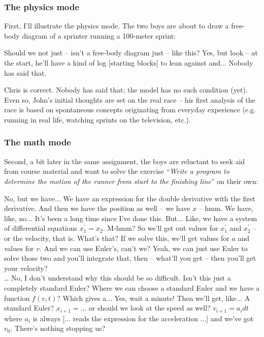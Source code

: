 \documentclass[aps,prb,floatfix,twocolumn,twoside,english]{revtex4-1}
\begin{document}
\subsubsection*{The physics mode}
First, I'll illustrate the physics mode. The two boys are about to draw a free-body diagram of a sprinter running a 100-meter sprint:

\begin{dialogue}
\small
{} Should we not just -- isn't a free-body diagram just -- like this?
 Yes, but look -- at the start, he'll have a kind of log [starting blocks] to lean against and...
 Nobody has said that.
\end{dialogue}

Chris is correct. Nobody has said that; the model has no such condition (yet). Even so, John's initial thoughts are set on the real race -- his first analysis of the race is based on spontaneous concepts originating from everyday experience (e.g. running in real life, watching sprints on the television, etc.).

\subsubsection*{The math mode}
Second, a bit later in the same assignment, the boys are reluctant to seek aid from course material and want to solve the exercise ``\textit{Write a program to determine the motion of the runner from start to the finishing line}'' on their own:

\begin{dialogue}
\small
{} No, but we have... We have an expression for the double derivative with the first derivative. And then we have the position as well -- we have $x$ -- hmm. We have, like, no... It's been a long time since I've done this.
 But...
 Like, we have a system of differential equations $x_1^{\prime} = x_2$. 
 M-hmm? 
 So we'll get out values for $x_1^{\prime}$ and $x_2^{\prime}$ -- or the velocity, that is.
 What's that?
 If we solve this, we'll get values for $a$ and values for $v$. And we can use Euler's, can't we?
 Yeah, we can just use Euler to solve those two and you'll integrate that, then -- what'll you get -- then you'll get your velocity?
\\ \dots
{} No, I don't understand why this should be so difficult. Isn't this just a completely standard Euler? Where we can choose a standard Euler and we have a function $f(v,t)$? Which gives a...
 Yes, wait a minute!
 Then we'll get, like...
 A standard Euler? $x_{i+1} = ...$ or should we look at the speed as well?
 $v_{i+1} = a_i dt$ where $a_i$ is always [... reads the expression for the acceleration ...] and we've got $v_0$. There's nothing stopping us?
\end{dialogue}
\end{document}
